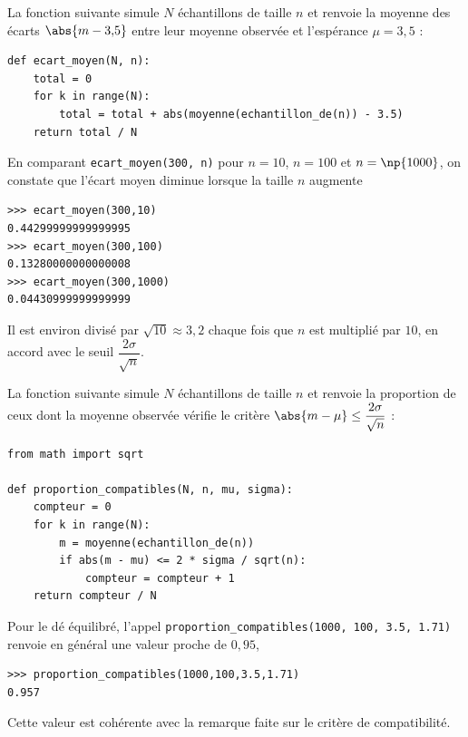 \begin{ex}
	La fonction suivante simule $N$ échantillons de taille $n$ et renvoie la moyenne des écarts $\abs{m - 3{,}5}$ entre leur moyenne observée et l'espérance $\mu = 3{,}5$ :

	\begin{lstlisting}
def ecart_moyen(N, n):
    total = 0
    for k in range(N):
        total = total + abs(moyenne(echantillon_de(n)) - 3.5)
    return total / N
\end{lstlisting}

	En comparant \texttt{ecart\_moyen(300, n)} pour $n=10$, $n=100$ et $n=\np{1000}$, on constate que l'écart moyen diminue lorsque la taille $n$ augmente

	\begin{lstlisting}
>>> ecart_moyen(300,10)
0.44299999999999995
>>> ecart_moyen(300,100)
0.13280000000000008
>>> ecart_moyen(300,1000)
0.04430999999999999
\end{lstlisting}

	Il est environ divisé par $\sqrt{10} \approx 3{,}2$ chaque fois que $n$ est multiplié par $10$, en accord avec le seuil $\dfrac{2\sigma}{\sqrt{n}}$.

\end{ex}

\begin{ex}
	La fonction suivante simule $N$ échantillons de taille $n$ et renvoie la proportion de ceux dont la moyenne observée vérifie le critère $\abs{m - \mu} \leq \dfrac{2\sigma}{\sqrt{n}}$ :

	\ms

	\begin{lstlisting}
from math import sqrt

def proportion_compatibles(N, n, mu, sigma):
    compteur = 0
    for k in range(N):
        m = moyenne(echantillon_de(n))
        if abs(m - mu) <= 2 * sigma / sqrt(n):
            compteur = compteur + 1
    return compteur / N
\end{lstlisting}

	Pour le dé équilibré, l'appel \texttt{proportion\_compatibles(1000, 100, 3.5, 1.71)} renvoie en général une valeur proche de $0{,}95$,

	\begin{lstlisting}
>>> proportion_compatibles(1000,100,3.5,1.71)
0.957
\end{lstlisting}

	Cette valeur est cohérente avec la remarque faite sur le critère de compatibilité.
\end{ex}

